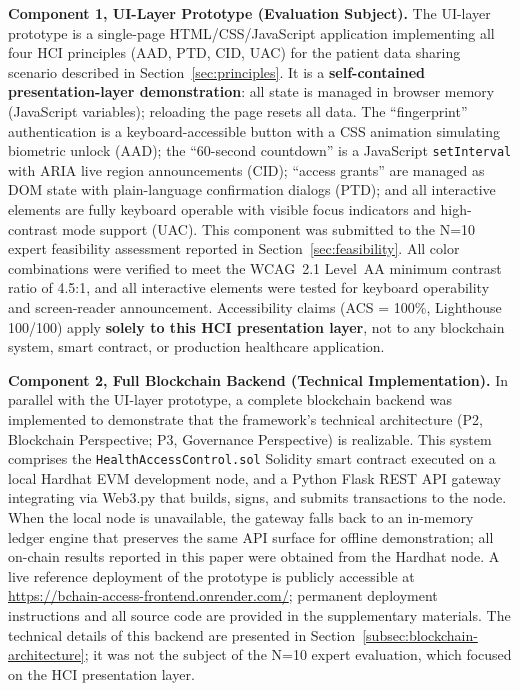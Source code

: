 \documentclass[journal,onecolumn]{IEEEtran}
\begin{document}
\textbf{Component 1, UI-Layer Prototype (Evaluation Subject).} The UI-layer prototype is a single-page HTML/CSS/JavaScript application implementing all four HCI principles (AAD, PTD, CID, UAC) for the patient data sharing scenario described in Section~\ref{sec:principles}. It is a \textbf{self-contained presentation-layer demonstration}: all state is managed in browser memory (JavaScript variables); reloading the page resets all data. The ``fingerprint'' authentication is a keyboard-accessible button with a CSS animation simulating biometric unlock (AAD); the ``60-second countdown'' is a JavaScript \texttt{setInterval} with ARIA live region announcements (CID); ``access grants'' are managed as DOM state with plain-language confirmation dialogs (PTD); and all interactive elements are fully keyboard operable with visible focus indicators and high-contrast mode support (UAC). This component was submitted to the N=10 expert feasibility assessment reported in Section~\ref{sec:feasibility}. All color combinations were verified to meet the WCAG~2.1 Level~AA minimum contrast ratio of 4.5:1, and all interactive elements were tested for keyboard operability and screen-reader announcement. Accessibility claims (ACS = 100\%, Lighthouse 100/100) apply \textbf{solely to this HCI presentation layer}, not to any blockchain system, smart contract, or production healthcare application.

\textbf{Component 2, Full Blockchain Backend (Technical Implementation).} In parallel with the UI-layer prototype, a complete blockchain backend was implemented to demonstrate that the framework's technical architecture (P2, Blockchain Perspective; P3, Governance Perspective) is realizable. This system comprises the \texttt{HealthAccessControl.sol} Solidity smart contract executed on a local Hardhat EVM development node, and a Python Flask REST API gateway integrating via Web3.py that builds, signs, and submits transactions to the node. When the local node is unavailable, the gateway falls back to an in-memory ledger engine that preserves the same API surface for offline demonstration; all on-chain results reported in this paper were obtained from the Hardhat node. A live reference deployment of the prototype is publicly accessible at \url{https://bchain-access-frontend.onrender.com/}; permanent deployment instructions and all source code are provided in the supplementary materials. The technical details of this backend are presented in Section~\ref{subsec:blockchain-architecture}; it was not the subject of the N=10 expert evaluation, which focused on the HCI presentation layer.
\end{document}
